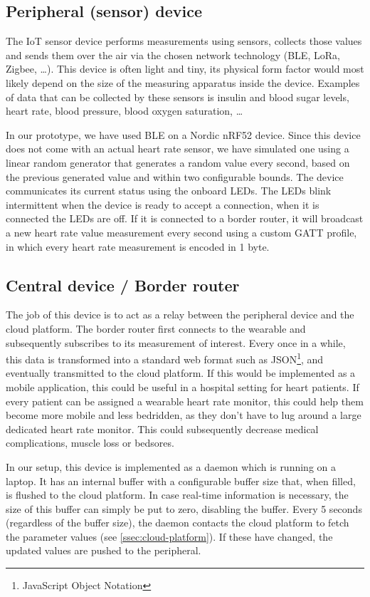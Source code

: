 \documentclass[12pt, a4paper]{article}
\newcommand{\lora}{LoRa}
\newcommand{\bles}{BLE}
\newcommand{\iot}{IoT}
\newcommand{\gatt}{GATT}
\begin{document}
\subsection{Peripheral (sensor) device}
The \iot{} sensor device performs measurements using sensors, collects those values and sends them over the air via the chosen network technology (\bles{}, \lora{}, Zigbee, \ldots). This device is often light and tiny, its physical form factor would most likely depend on the size of the measuring apparatus inside the device. Examples of data that can be collected by these sensors is insulin and blood sugar levels, heart rate, blood pressure, blood oxygen saturation, \ldots

In our prototype, we have used \bles{} on a Nordic nRF52 device. Since this device does not come with an actual heart rate sensor, we have simulated one using a linear random generator that generates a random value every second, based on the previous generated value and within two configurable bounds. The device communicates its current status using the onboard LEDs. The LEDs blink intermittent when the device is ready to accept a connection, when it is connected the LEDs are off. If it is connected to a border router, it will broadcast a new heart rate value measurement every second using a custom \gatt{} profile, in which every heart rate measurement is encoded in 1 byte.

\subsection{Central device / Border router}

The job of this device is to act as a relay between the peripheral device and the cloud platform. The border router first connects to the wearable and subsequently subscribes to its measurement of interest. Every once in a while, this data is transformed into a standard web format such as JSON\footnote{JavaScript Object Notation}, and eventually transmitted to the cloud platform. If this would be implemented as a mobile application, this could be useful in a hospital setting for heart patients. If every patient can be assigned a wearable heart rate monitor, this could help them become more mobile and less bedridden, as they don't have to lug around a large dedicated heart rate monitor. This could subsequently decrease medical complications, muscle loss or bedsores.

In our setup, this device is implemented as a daemon which is running on a laptop. It has an internal buffer with a configurable buffer size that, when filled, is flushed to the cloud platform. In case real-time information is necessary, the size of this buffer can simply be put to zero, disabling the buffer. Every 5 seconds (regardless of the buffer size), the daemon contacts the cloud platform to fetch the parameter values (see \autoref{ssec:cloud-platform}). If these have changed, the updated values are pushed to the peripheral.
\end{document}
